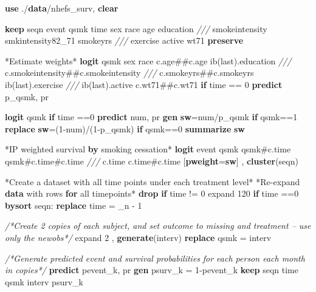 \documentclass[
  10pt,
]{book}
\newenvironment{Shaded}{\begin{snugshade}}{\end{snugshade}}
\newcommand{\BaseNTok}[1]{\textcolor[rgb]{0.00,0.00,0.81}{#1}}
\newcommand{\CommentTok}[1]{\textcolor[rgb]{0.56,0.35,0.01}{\textit{#1}}}
\newcommand{\DataTypeTok}[1]{\textcolor[rgb]{0.13,0.29,0.53}{#1}}
\newcommand{\DecValTok}[1]{\textcolor[rgb]{0.00,0.00,0.81}{#1}}
\newcommand{\FunctionTok}[1]{\textcolor[rgb]{0.00,0.00,0.00}{#1}}
\newcommand{\KeywordTok}[1]{\textcolor[rgb]{0.13,0.29,0.53}{\textbf{#1}}}
\newcommand{\NormalTok}[1]{#1}
\newcommand{\OtherTok}[1]{\textcolor[rgb]{0.56,0.35,0.01}{#1}}
\begin{document}
\begin{Shaded}
\begin{Highlighting}[]
\KeywordTok{use}\NormalTok{ ./}\KeywordTok{data}\NormalTok{/nhefs_surv, }\KeywordTok{clear}

\KeywordTok{keep}\NormalTok{ seqn event qsmk time sex race age education }\CommentTok{///}
\NormalTok{  smokeintensity smkintensity82_71 smokeyrs }\CommentTok{///}
\NormalTok{  exercise active wt71}
\KeywordTok{preserve} 

\NormalTok{*Estimate weights*}
\KeywordTok{logit}\NormalTok{ qsmk sex race c.age##c.age ib(}\FunctionTok{last}\NormalTok{).education }\CommentTok{///}
\NormalTok{  c.smokeintensity##c.smokeintensity }\CommentTok{///}
\NormalTok{  c.smokeyrs##c.smokeyrs ib(}\FunctionTok{last}\NormalTok{).exercise }\CommentTok{///}
\NormalTok{  ib(}\FunctionTok{last}\NormalTok{).active c.wt71##c.wt71 }\KeywordTok{if}\NormalTok{ time == 0}
\KeywordTok{predict}\NormalTok{ p_qsmk, pr}

\KeywordTok{logit}\NormalTok{ qsmk }\KeywordTok{if}\NormalTok{ time ==0 }
\KeywordTok{predict}\NormalTok{ num, pr}
\KeywordTok{gen} \KeywordTok{sw}\NormalTok{=num/p_qsmk }\KeywordTok{if}\NormalTok{ qsmk==1}
\KeywordTok{replace} \KeywordTok{sw}\NormalTok{=(1-num)/(1-p_qsmk) }\KeywordTok{if}\NormalTok{ qsmk==0}
\KeywordTok{summarize} \KeywordTok{sw}

\NormalTok{*IP weighted survival }\KeywordTok{by}\NormalTok{ smoking cessation*}
\KeywordTok{logit}\NormalTok{ event qsmk qsmk#c.time qsmk#c.time#c.time }\CommentTok{///}
\NormalTok{  c.time c.time#c.time [}\KeywordTok{pweight}\NormalTok{=}\KeywordTok{sw}\NormalTok{] , }\KeywordTok{cluster}\NormalTok{(seqn) }

\NormalTok{*Create a dataset with }\OtherTok{all}\NormalTok{ time points under each treatment }\DecValTok{level}\NormalTok{*}
\NormalTok{*Re-expand }\KeywordTok{data}\NormalTok{ with }\BaseNTok{rows} \KeywordTok{for} \OtherTok{all}\NormalTok{ timepoints*}
\KeywordTok{drop} \KeywordTok{if}\NormalTok{ time != 0}
\NormalTok{expand 120 }\KeywordTok{if}\NormalTok{ time ==0 }
\KeywordTok{bysort}\NormalTok{ seqn: }\KeywordTok{replace}\NormalTok{ time = }\DataTypeTok{_n}\NormalTok{ - 1		 }
		
\CommentTok{/*Create 2 copies of each subject, and set outcome }
\CommentTok{to missing and treatment -- use only the newobs*/}
\NormalTok{expand 2 , }\KeywordTok{generate}\NormalTok{(interv) }
\KeywordTok{replace}\NormalTok{ qsmk = interv	}

\CommentTok{/*Generate predicted event and survival probabilities }
\CommentTok{for each person each month in copies*/}
\KeywordTok{predict}\NormalTok{ pevent_k, pr}
\KeywordTok{gen}\NormalTok{ psurv_k = 1-pevent_k}
\KeywordTok{keep}\NormalTok{ seqn time qsmk interv psurv_k }


\end{Highlighting}
\end{Shaded}
\end{document}
